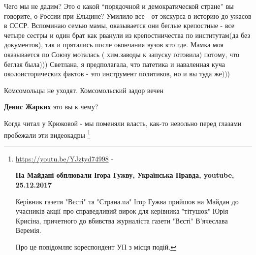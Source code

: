 \begin{itemize}
 

Чего мы не дадим? Это о какой \enquote{порядочной и демократической стране} вы
говорите, о России при Ельцине? Умилило все - от экскурса в историю до ужасов в
СССР. Вспоминаю семью мамы, оказывается они беглые крепостные - все четыре
сестры и один брат как рванули из крепостничества по институтам(да без
документов), так и прятались после окончания вузов кто где. Мамка моя
оказывается по Союзу моталась ( хим.заводы к запуску готовила) потому, что
беглая была))) Светлана, я предполагала, что патетика и наваленная куча
околоисторических фактов - это инструмент политиков, но и вы туда же)))

 
Комсомольцы не уходят. Комсомольский задор вечен

\begin{itemize}
 
\textbf{Денис Жарких} это вы к чему?

 
Когда читал у Крюковой - мы поменяли власть, как-то невольно перед глазами пробежали эти видеокадры 
\footnote{
\url{https://youtu.be/YJztyd74998} - \par
{\bfseries На Майдані обплювали Ігора Гужву, Українська Правда, youtube, 25.12.2017}

Керівник газети "Вєсті" та "Страна.uа" Ігор Гужва прийшов на Майдан до
учасників акції про справедливий вирок для керівника "тітушок" Юрія Крисіна,
причетного до вбивства журналіста газети "Вєсті" В'ячеслава Веремія. 

Про це повідомляє кореспондент УП з місця подій.

}
\end{itemize}
\end{itemize}
